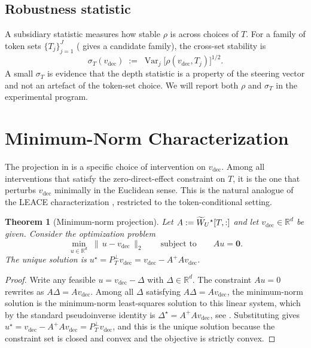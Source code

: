 \documentclass[11pt,letterpaper]{article}
\theoremstyle{plain}
\newtheorem{theorem}{Theorem}[section]
\theoremstyle{definition}
\DeclareMathOperator{\Var}{Var}
\newcommand{\R}{\mathbb{R}}
\newcommand{\1}{\mathbf{1}}
\newcommand{\zero}{\mathbf{0}}
\newcommand{\WUt}{\widetilde{W}_{U}\mathchoice{}{}{}{}}
\newcommand{\vdec}{v_{\text{dec}}}
\newcommand{\PTperp}{P_{T}^{\perp}}
\begin{document}
\subsection{Robustness statistic}

A subsidiary statistic measures how stable $\rho$ is across choices of $T$. For a family of token sets $\{T_j\}_{j=1}^J$ ( gives a candidate family), the cross-set stability is
\begin{equation}
\sigma_T(\vdec) \;:=\; \Var_{j} \big[ \rho(\vdec, T_j) \big]^{1/2}.
\label{eq:sigmaT}
\end{equation}
A small $\sigma_T$ is evidence that the depth statistic is a property of the steering vector and not an artefact of the token-set choice. We will report both $\rho$ and $\sigma_T$ in the experimental program.

\section{Minimum-Norm Characterization}\label{sec:minnorm}

The projection in  is a specific choice of intervention on $\vdec$. Among all interventions that satisfy the zero-direct-effect constraint on $T$, it is the one that perturbs $\vdec$ minimally in the Euclidean sense. This is the natural analogue of the LEACE characterization \cite{belrose2023leace}, restricted to the token-conditional setting.

\begin{theorem}[Minimum-norm projection]\label{thm:minnorm}
Let $A := \WUt^\star[T,:]$ and let $\vdec \in \R^d$ be given. Consider the optimization problem
\begin{equation}
\min_{u \in \R^d} \;\|\,u - \vdec\,\|_2 \qquad \text{subject to}\qquad A u = \zero.
\label{eq:minnormproblem}
\end{equation}
The unique solution is $u^\star = \PTperp \vdec = \vdec - A^+ A \vdec$.
\end{theorem}

\begin{proof}
Write any feasible $u = \vdec - \Delta$ with $\Delta \in \R^d$. The constraint $A u = 0$ rewrites as $A \Delta = A \vdec$. Among all $\Delta$ satisfying $A \Delta = A \vdec$, the minimum-norm solution is the minimum-norm least-squares solution to this linear system, which by the standard pseudoinverse identity is $\Delta^\star = A^+ A \vdec$, see \cite[Sec.\ 5.5]{horn2012matrix}. Substituting gives $u^\star = \vdec - A^+ A \vdec = \PTperp \vdec$, and this is the unique solution because the constraint set is closed and convex and the objective is strictly convex.
\end{proof}
\end{document}
